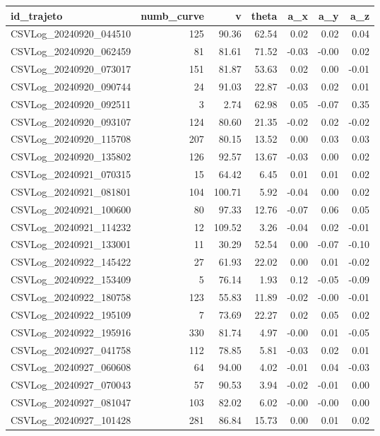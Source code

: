 \begin{tabular}{lrrrrrr}
\toprule
id_trajeto & numb_curve & v & theta & a_x & a_y & a_z \\
\midrule
CSVLog_20240920_044510 & 125 & 90.36 & 62.54 & 0.02 & 0.02 & 0.04 \\
CSVLog_20240920_062459 & 81 & 81.61 & 71.52 & -0.03 & -0.00 & 0.02 \\
CSVLog_20240920_073017 & 151 & 81.87 & 53.63 & 0.02 & 0.00 & -0.01 \\
CSVLog_20240920_090744 & 24 & 91.03 & 22.87 & -0.03 & 0.02 & 0.01 \\
CSVLog_20240920_092511 & 3 & 2.74 & 62.98 & 0.05 & -0.07 & 0.35 \\
CSVLog_20240920_093107 & 124 & 80.60 & 21.35 & -0.02 & 0.02 & -0.02 \\
CSVLog_20240920_115708 & 207 & 80.15 & 13.52 & 0.00 & 0.03 & 0.03 \\
CSVLog_20240920_135802 & 126 & 92.57 & 13.67 & -0.03 & 0.00 & 0.02 \\
CSVLog_20240921_070315 & 15 & 64.42 & 6.45 & 0.01 & 0.01 & 0.02 \\
CSVLog_20240921_081801 & 104 & 100.71 & 5.92 & -0.04 & 0.00 & 0.02 \\
CSVLog_20240921_100600 & 80 & 97.33 & 12.76 & -0.07 & 0.06 & 0.05 \\
CSVLog_20240921_114232 & 12 & 109.52 & 3.26 & -0.04 & 0.02 & -0.01 \\
CSVLog_20240921_133001 & 11 & 30.29 & 52.54 & 0.00 & -0.07 & -0.10 \\
CSVLog_20240922_145422 & 27 & 61.93 & 22.02 & 0.00 & 0.01 & -0.02 \\
CSVLog_20240922_153409 & 5 & 76.14 & 1.93 & 0.12 & -0.05 & -0.09 \\
CSVLog_20240922_180758 & 123 & 55.83 & 11.89 & -0.02 & -0.00 & -0.01 \\
CSVLog_20240922_195109 & 7 & 73.69 & 22.27 & 0.02 & 0.05 & 0.02 \\
CSVLog_20240922_195916 & 330 & 81.74 & 4.97 & -0.00 & 0.01 & -0.05 \\
CSVLog_20240927_041758 & 112 & 78.85 & 5.81 & -0.03 & 0.02 & 0.01 \\
CSVLog_20240927_060608 & 64 & 94.00 & 4.02 & -0.01 & 0.04 & -0.03 \\
CSVLog_20240927_070043 & 57 & 90.53 & 3.94 & -0.02 & -0.01 & 0.00 \\
CSVLog_20240927_081047 & 103 & 82.02 & 6.02 & -0.00 & -0.00 & 0.00 \\
CSVLog_20240927_101428 & 281 & 86.84 & 15.73 & 0.00 & 0.01 & 0.02 \\

\end{tabular}
